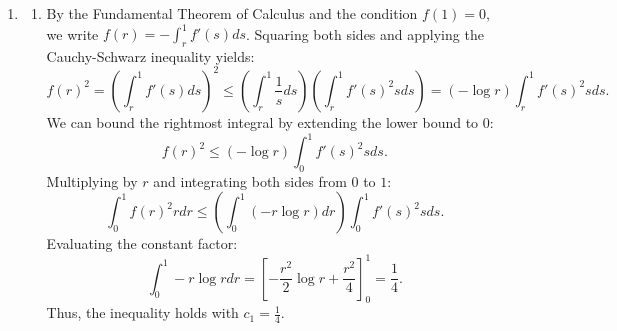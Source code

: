 \documentclass[10pt,a4paper]{article}
\begin{document}
\begin{enumerate}[label=\fbox{\arabic*}]
\begin{enumerate}[label=(\arabic*)]
          \item To show $H_f$ is compact, we first assume $f$ is a continuous function with compact support in $[0, R]$. Then $f(x+y) = 0$ whenever $x+y > R$. Consequently, for any $g$, $(H_f g)(x) = 0$ for $x > R$. The function $H_f g$ is supported in $[0, R]$.
          Let $B$ be the unit ball in $L^1([0, \infty))$. For $g \in B$, $|(H_f g)(x)| \le \sup |f| \|g\|_1 \le \sup |f|$, so the image $H_f(B)$ is uniformly bounded in $C([0, R])$.
          To show equicontinuity:
          \[
            |(H_f g)(x+h) - (H_f g)(x)| \le \int_0^R |f(x+h+y) - f(x+y)| |g(y)| dy \le \sup_u |f(u+h) - f(u)| \|g\|_1.
          \]
          Since continuous functions on compact supports are uniformly continuous, the supremum goes to zero as $h \to 0$ independently of $g$. Thus, $H_f(B)$ is equicontinuous. By the Arzelà-Ascoli theorem, $H_f(B)$ is relatively compact in $C([0, R])$. Since convergence in the supremum norm on a bounded interval implies convergence in the $L^1$ norm, $H_f(B)$ is relatively compact in $L^1([0, \infty))$, making $H_f$ a compact operator for such $f$.
          For an arbitrary $f \in L^1([0, \infty))$, since compactly supported continuous functions are dense in $L^1$, we can choose a sequence $f_n$ of such functions converging to $f$ in $L^1$. The inequality from part (1) gives $\|H_{f_n} - H_f\| = \|H_{f_n - f}\| \le \|f_n - f\|_1 \to 0$. Since the limit of compact operators under the operator norm topology is compact, $H_f$ is a compact operator for any $f \in L^1$.
        \end{enumerate}

  \item %
        \begin{enumerate}[label=(\arabic*)]
          \item By the Fundamental Theorem of Calculus and the condition $f(1) = 0$, we write $f(r) = -\int_r^1 f'(s) ds$. Squaring both sides and applying the Cauchy-Schwarz inequality yields:
          \[
            f(r)^2 = \left( \int_r^1 f'(s) ds \right)^2 \le \left( \int_r^1 \frac{1}{s} ds \right) \left( \int_r^1 f'(s)^2 s ds \right) = (-\log r) \int_r^1 f'(s)^2 s ds.
          \]
          We can bound the rightmost integral by extending the lower bound to 0:
          \[
            f(r)^2 \le (-\log r) \int_0^1 f'(s)^2 s ds.
          \]
          Multiplying by $r$ and integrating both sides from $0$ to $1$:
          \[
            \int_0^1 f(r)^2 r dr \le \left( \int_0^1 (-r \log r) dr \right) \int_0^1 f'(s)^2 s ds.
          \]
          Evaluating the constant factor:
          \[
            \int_0^1 -r \log r dr = \left[ -\frac{r^2}{2} \log r + \frac{r^2}{4} \right]_0^1 = \frac{1}{4}.
          \]
          Thus, the inequality holds with $c_1 = \frac{1}{4}$.


\end{enumerate}
\end{enumerate}
\end{document}
